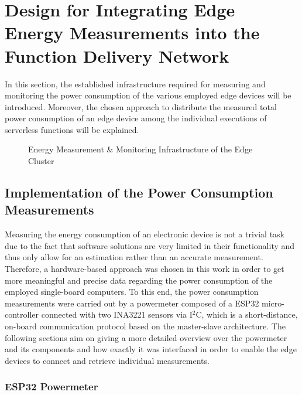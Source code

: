 \chapter{Design for Integrating Edge Energy Measurements into the Function Delivery Network}\label{chapter:methodology}
In this section, the established infrastructure required for measuring and monitoring the power consumption of the various employed edge devices will be introduced. Moreover, the chosen approach to distribute the measured total power consumption of an edge device among the individual executions of serverless functions will be explained.

\begin{figure}[h]
    \centering
    
    \caption{Energy Measurement \& Monitoring Infrastructure of the Edge Cluster}
    \label{fig:fdn-edge-energy-enhancement}
\end{figure}

\section{Implementation of the Power Consumption Measurements}
Measuring the energy consumption of an electronic device is not a trivial task due to the fact that software solutions are very limited in their functionality and thus only allow for an estimation rather than an accurate measurement. Therefore, a hardware-based approach was chosen in this work in order to get more meaningful and precise data regarding the power consumption of the employed single-board computers. To this end, the power consumption measurements were carried out by a powermeter composed of a ESP32 micro-controller connected with two INA3221 sensors via I$^{2}$C, which is a short-distance, on-board communication protocol based on the master-slave architecture. The following sections aim on giving a more detailed overview over the powermeter and its components and how exactly it was interfaced in order to enable the edge devices to connect and retrieve individual measurements.

\subsection{ESP32 Powermeter}

